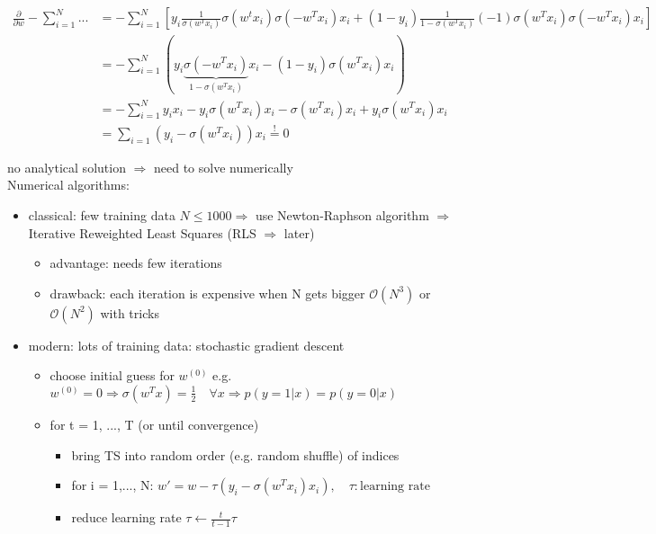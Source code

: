 \documentclass[11pt]{article}
\begin{document}
        \begin{equation*}
          \begin{align*}
          \frac{\partial}{\partial w} -\sum_{i=1}^{N}... &= -\sum_{i=1}^{N}[y_i \frac{1}{\sigma(w^Tx_i)}\sigma(w^tx_i)\sigma(-w^Tx_i)x_i +
          (1-y_i) \frac{1}{1-\sigma(w^Tx_i)}(-1)\sigma(w^Tx_i)\sigma(-w^Tx_i)x_i] \\
          &= -\sum_{i=1}^{N} (y_{i} \underbrace{\sigma(-w^T x_i)}_{1-\sigma(w^Tx_i)}x_i - (1- y_i)\sigma(w^T x_i)x_i) \\
          &= - \sum_{i=1}^{N} y_i x_i - y_i\sigma(w^T x_i) x_i - \sigma(w^Tx_i)x_i + y_i \sigma(w^T x_i) x_i \\
          &= \sum_{i=1} (y_i - \sigma(w^T x_i)) x_i \overset{!}{=} 0
          \end{align*}
        \end{equation*}

        no analytical solution $\Rightarrow$ need to solve numerically \\
        Numerical algorithms:
        \begin{itemize}
          \item classical: few training data $N \leq 1000 \Rightarrow$ use Newton-Raphson algorithm $\Rightarrow$ Iterative Reweighted Least Squares (RLS $\Rightarrow$ later)
          \begin{itemize}
            \item advantage: needs few iterations
            \item drawback: each iteration is expensive when N gets bigger $\mathcal{O}(N^3)$ or $\mathcal{O}(N^2)$ with tricks
          \end{itemize}
          \item modern: lots of training data: stochastic gradient descent
          \begin{itemize}
            \item choose initial guess for $w^{(0)}$ e.g. $w^{(0)} = 0 \Rightarrow \sigma(w^T x) = \frac{1}{2} \quad \forall x \Rightarrow p(y=1|x) = p(y=0|x)$
            \item for t = 1, ..., T (or until convergence)
            \begin{itemize}
              \item bring TS into random order (e.g. random shuffle) of indices
              \item for i = 1,..., N: $w' = w - \tau(y_{i} - \sigma(w^T x_{i})x_{i}), \quad \tau: \text{learning rate}$
              \item reduce learning rate $ \tau \leftarrow \frac{t}{t-1} \tau$
            \end{itemize}
          \end{itemize}
        \end{itemize}
\end{document}

